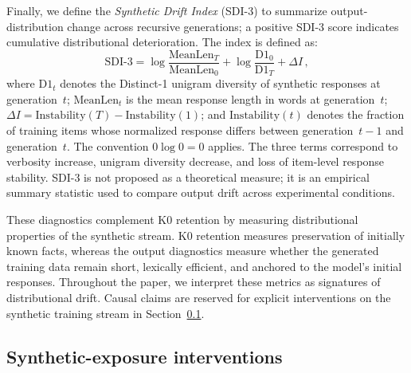 \documentclass[a4paper,fleqn]{cas-dc}
\newif\ifshowchanges
\newcommand{\rev}[1]{\ifshowchanges{\color{blue}#1}\else{#1}\fi}
\begin{document}
Finally, we define the \textit{Synthetic Drift Index} (SDI-3) to summarize
output-distribution change across recursive generations;
\rev{a positive SDI-3 score indicates cumulative distributional deterioration}. The index is defined as:
\begin{equation}\label{eq:sdi}
    \mathrm{SDI\text{-}3} =
    \log\frac{\mathrm{MeanLen}_T}{\mathrm{MeanLen}_0}
    + \log\frac{\mathrm{D1}_0}{\mathrm{D1}_T}
    + \Delta I\,,
\end{equation}
where $\mathrm{D1}_t$ denotes the \rev{Distinct-1 unigram diversity} of synthetic
responses at generation~$t$; $\mathrm{MeanLen}_t$ is the mean response length in
words at generation~$t$; $\Delta I = \mathrm{Instability}(T) -
\mathrm{Instability}(1)$; and $\mathrm{Instability}(t)$ denotes the fraction of
training items whose normalized response differs between generation~$t{-}1$ and
generation~$t$. The convention $0\log 0 = 0$ applies. The three terms correspond to verbosity increase, unigram
diversity decrease, and loss of item-level response stability. SDI-3 is not
proposed as a theoretical measure; it is an empirical summary statistic used to
compare output drift across experimental conditions.

These diagnostics complement K0 retention by measuring distributional properties
of the synthetic stream. K0 retention measures preservation of initially known
facts, whereas the output diagnostics measure whether the generated training
data remain short, lexically efficient, and anchored to the model's initial
responses. Throughout the paper, we interpret these metrics as signatures of
distributional drift. Causal claims are reserved for explicit interventions on
the synthetic training stream in Section~\ref{sec:intervention}.

\subsection{Synthetic-exposure interventions}\label{sec:intervention}
\end{document}
